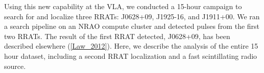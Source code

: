 Using this new capability at the VLA, we conducted a 15-hour campaign to search for and localize three RRATs: J0628+09, J1925-16, and J1911+00. We ran a search pipeline on an NRAO compute cluster and detected pulses from the first two RRATs. The result of the first RRAT detected, J0628+09, has been described elsewhere (\ref{Law_2012}). Here, we describe the analysis of the entire 15 hour dataset, including a second RRAT localization and a fast scintillating radio source.

  
  
  
  
  